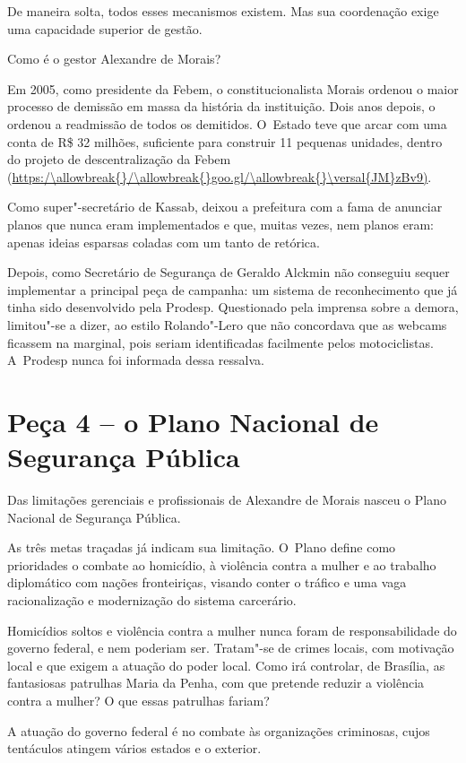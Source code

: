 De maneira solta, todos esses mecanismos existem. Mas sua coordenação
exige uma capacidade superior de gestão.

Como é o gestor Alexandre de Morais?

Em 2005, como presidente da Febem, o constitucionalista Morais ordenou o
maior processo de demissão em massa da história da instituição. Dois
anos depois, o  ordenou a readmissão de todos os demitidos. O~Estado
teve que arcar com uma conta de R\$ 32 milhões, suficiente para
construir 11 pequenas unidades, dentro do projeto de descentralização da
Febem (\url{https:/\allowbreak{}/\allowbreak{}goo.gl/\allowbreak{}\versal{JM}zBv9)}.

Como super"-secretário de Kassab, deixou a prefeitura com a fama de
anunciar planos que nunca eram implementados e que, muitas vezes, nem
planos eram: apenas ideias esparsas coladas com um tanto de retórica.

Depois, como Secretário de Segurança de Geraldo Alckmin não conseguiu
sequer implementar a principal peça de campanha: um sistema de
reconhecimento que já tinha sido desenvolvido pela Prodesp. Questionado
pela imprensa sobre a demora, limitou"-se a dizer, ao estilo Rolando"-Lero
que não concordava que as webcams ficassem na marginal, pois seriam
identificadas facilmente pelos motociclistas. A~Prodesp nunca foi
informada dessa ressalva.

\section{Peça 4 -- o Plano Nacional de Segurança Pública}

Das limitações gerenciais e profissionais de Alexandre de Morais nasceu
o Plano Nacional de Segurança Pública.

As três metas traçadas já indicam sua limitação. O~Plano define como
prioridades o combate ao homicídio, à violência contra a mulher e ao
trabalho diplomático com nações fronteiriças, visando conter o tráfico e
uma vaga racionalização e modernização do sistema carcerário.

Homicídios soltos e violência contra a mulher nunca foram de
responsabilidade do governo federal, e nem poderiam ser. Tratam"-se de
crimes locais, com motivação local e que exigem a atuação do poder
local. Como irá controlar, de Brasília, as fantasiosas patrulhas Maria
da Penha, com que pretende reduzir a violência contra a mulher? O que
essas patrulhas fariam?

A atuação do governo federal é no combate às organizações criminosas,
cujos tentáculos atingem vários estados e o exterior.

